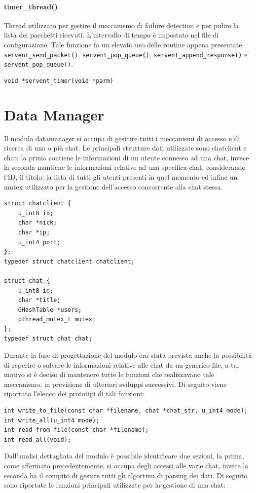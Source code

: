 \paragraph{timer\_thread()}
Thread utilizzato per gestire il meccanismo di failure detection e per pulire la lista dei pacchetti ricevuti. L'intervallo di tempo è impostato nel file di configurazione. Tale funzione fa un elevato uso delle routine appena presentate \texttt{servent\_send\_packet()}, \texttt{servent\_pop\_queue()}, \texttt{servent\_append\_response()} e \texttt{servent\_pop\_queue()}.
\begin{lstlisting}
void *servent_timer(void *parm)
\end{lstlisting}

\section{Data Manager}
Il modulo datamanager si occupa di gesttire tutti i meccanismi di accesso e di ricerca di una o più chat. Le principali strutture dati utilizzate sono chatclient e chat; la prima contiene le informazioni di un utente connesso ad una chat, invece la seconda mantiene le informazioni relative ad una specifica chat, considerando l'ID, il titolo, la lista di tutti gli utenti presenti in quel momento ed infine un mutex utilizzato per la gestione dell'accesso concorrente alla chat stessa. 
\begin{lstlisting}
struct chatclient {
	u_int8 id;
	char *nick;
	char *ip;
	u_int4 port;
};
typedef struct chatclient chatclient;

struct chat {
	u_int8 id;
	char *title;
	GHashTable *users;
	pthread_mutex_t mutex;
};
typedef struct chat chat;
\end{lstlisting}
Durante la fase di progettazione del modulo era stata prevista anche la possibilità di reperire o salvare le informazioni relative alle chat da un generico file, a tal motivo si è deciso di mantenere tutte le funzioni che realizzavano tale meccanismo, in previsione  di ulteriori sviluppi successivi. Di seguito viene riportato l'elenco dei prototipi di tali funzioni:
\begin{lstlisting}
int write_to_file(const char *filename, chat *chat_str, u_int4 mode);
int write_all(u_int4 mode);
int read_from_file(const char *filename);
int read_all(void);	
\end{lstlisting}  
Dall'analisi dettagliata del modulo è possibile identificare due sezioni, la prima, come affermato precedentemente, si occupa degli accessi alle varie chat, invece la seconda ha il compito di gestire tutti gli algortimi di parsing dei dati. Di seguito sono riportate le funzioni principali utilizzate per la gestione di una chat:
